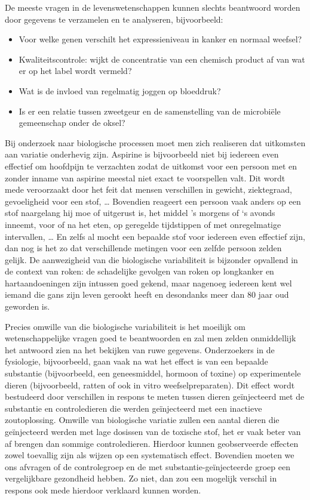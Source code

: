\documentclass[
  12pt,dutch,coursenotes]{book}
\providecommand{\tightlist}{%
  \setlength{\itemsep}{0pt}\setlength{\parskip}{0pt}}
\theoremstyle{definition}
\theoremstyle{definition}
\theoremstyle{definition}
\theoremstyle{definition}
\theoremstyle{remark}
\begin{document}
De meeste vragen in de levenswetenschappen kunnen slechts beantwoord worden door gegevens te verzamelen en te analyseren, bijvoorbeeld:

\begin{itemize}
\tightlist
\item
  Voor welke genen verschilt het expressieniveau in kanker en normaal weefsel?
\item
  Kwaliteitscontrole: wijkt de concentratie van een chemisch product af van wat er op het label wordt vermeld?\\
\item
  Wat is de invloed van regelmatig joggen op bloeddruk?
\item
  Is er een relatie tussen zweetgeur en de samenstelling van de microbiële gemeenschap onder de oksel?
\end{itemize}

Bij onderzoek naar biologische processen moet men zich realiseren dat uitkomsten aan variatie onderhevig zijn. Aspirine is bijvoorbeeld niet bij iedereen even effectief om hoofdpijn te verzachten zodat de uitkomst voor een persoon met en zonder inname van aspirine meestal niet exact te voorspellen valt. Dit wordt mede veroorzaakt door het feit dat mensen verschillen in gewicht, ziektegraad, gevoeligheid voor een stof, \ldots{} Bovendien reageert een persoon vaak anders op een stof naargelang hij moe of uitgerust is, het middel 's morgens of `s avonds inneemt, voor of na het eten, op geregelde tijdstippen of met onregelmatige intervallen, \ldots{} En zelfs al mocht een bepaalde stof voor iedereen even effectief zijn, dan nog is het zo dat verschillende metingen voor een zelfde persoon zelden gelijk.
De aanwezigheid van die biologische variabiliteit is bijzonder opvallend in de context van roken: de schadelijke gevolgen van roken op longkanker en hartaandoeningen zijn intussen goed gekend, maar nagenoeg iedereen kent wel iemand die gans zijn leven gerookt heeft en desondanks meer dan 80 jaar oud geworden is.

Precies omwille van die biologische variabiliteit is het moeilijk om wetenschappelijke vragen goed te beantwoorden en zal men zelden onmiddellijk het antwoord zien na het bekijken van ruwe gegevens. Onderzoekers in de fysiologie, bijvoorbeeld, gaan vaak na wat het effect is van een bepaalde substantie (bijvoorbeeld, een geneesmiddel, hormoon of toxine) op experimentele dieren (bijvoorbeeld, ratten of ook in vitro weefselpreparaten). Dit effect wordt bestudeerd door verschillen in respons te meten tussen dieren geïnjecteerd met de substantie en controledieren die werden geïnjecteerd met een inactieve zoutoplossing. Omwille van biologische variatie zullen een aantal dieren die geïnjecteerd werden met lage dosissen van de toxische stof, het er vaak beter van af brengen dan sommige controledieren. Hierdoor kunnen geobserveerde effecten zowel toevallig zijn als wijzen op een systematisch effect. Bovendien moeten we ons afvragen of de controlegroep en de met substantie-geïnjecteerde groep een vergelijkbare gezondheid hebben. Zo niet, dan zou een mogelijk verschil in respons ook mede hierdoor verklaard kunnen worden.
\end{document}

